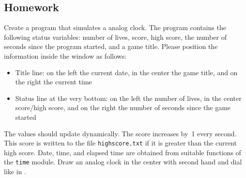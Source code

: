 \subsection{Homework}

\begin{figure}%
	\vspace{-1em}%
\end{figure}Create a program that simulates a analog clock. The program contains the following status variables: number of lives, score, high score, the number of seconds since the program started, and a game title. Please position the information inside the window as follows:
	
	\begin{itemize}
		\item Title line: on the left the current date, in the center the game title, and on the right the current time
		\item Status line at the very bottom: on the left the number of lives, in the center score/high score, and on the right the number of seconds since the game started
	\end{itemize}
	
The values should update dynamically. The score increases by~1 every second. This score is written to the file \texttt{highscore.txt} if it is greater than the current high score. Date, time, and elapsed time are obtained from suitable functions of the \texttt{time} module. Draw an analog clock in the center with second hand and dial like in .



